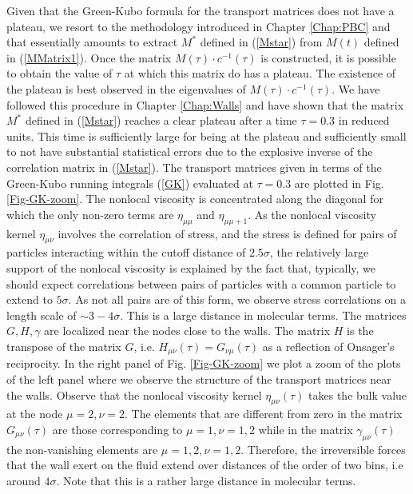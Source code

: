 \documentclass[b5paper,openright,10pt]{book}
\newcommand{\esc}{\!\cdot\!}
\begin{document}
Given that the  Green-Kubo formula for the transport  matrices does not
have  a   plateau,  we  resort   to  the  methodology   introduced  in
Chapter \ref{Chap:PBC} and that essentially amounts to extract $M^*$ defined in
(\ref{Mstar}) from $M(t)$ defined in (\ref{MMatrix1}). Once the matrix
$M(\tau)\esc c^{-1}(\tau)$  is constructed,  it is possible  to obtain
the  value of  $\tau$  at which  this  matrix do  has  a plateau.  The
existence  of the  plateau  is  best observed  in  the eigenvalues  of
$M(\tau)\esc  c^{-1}(\tau)$.   We  have  followed  this  procedure  in
Chapter \ref{Chap:Walls}
and have shown that the  matrix $M^*$ defined in (\ref{Mstar}) reaches
a clear plateau  after a time $\tau=0.3$ in reduced  units.  This time
is sufficiently large for being  at the plateau and sufficiently small
to  not  have substantial  statistical  errors  due to  the  explosive
inverse  of the  correlation  matrix in  (\ref{Mstar}). The  transport
matrices given in terms of the Green-Kubo running integrals (\ref{GK})
evaluated  at  $\tau=0.3$  are  plotted in  Fig.   \ref{Fig-GK-zoom}.   The
nonlocal viscosity is  concentrated along the diagonal  for which the
only non-zero terms are  $\eta_{\mu\mu}$ and $\eta_{\mu\mu+1}$. As the
nonlocal viscosity kernel $\eta_{\mu\nu}$ involves the correlation of
stress, and the  stress is defined for pairs  of particles interacting
within  the  cutoff  distance  of $2.5\sigma$,  the  relatively  large
support of the nonlocal viscosity is  explained by  the fact that,  typically, we  should expect
correlations  between pairs  of particles  with a  common particle  to
extend to  $5\sigma$. As not  all pairs are  of this form,  we observe
stress correlations on  a length scale of $\sim 3-4\sigma$.  This is a
large  distance in  molecular  terms.  The  matrices $G,H,\gamma$  are
localized near  the nodes close to  the walls.  The matrix  $H$ is the
transpose of the matrix $G$, i.e.  $H_{\mu\nu}(\tau)=G_{\nu\mu}(\tau)$
as a reflection of  Onsager's reciprocity.  In the right panel of Fig.  \ref{Fig-GK-zoom}
we plot  a zoom of the plots of the left panel where we observe  the structure of
the transport  matrices near  the walls.   Observe that  the nonlocal
viscosity  kernel $\eta_{\mu\nu}(\tau)$  takes the  bulk value  at the
node $\mu=2,\nu=2$. The  elements that are different from  zero in the
matrix $G_{\mu\nu}(\tau)$  are those corresponding  to $\mu=1,\nu=1,2$
while in the matrix $\gamma_{\mu\nu}(\tau)$ the non-vanishing elements
are $\mu=1,2,  \nu=1,2$.  Therefore, the irreversible  forces that the
wall exert  on the  fluid extend  over distances of  the order  of two
bins, i.e around $4\sigma$.  Note that this is a rather large distance
in molecular terms.
\end{document}
